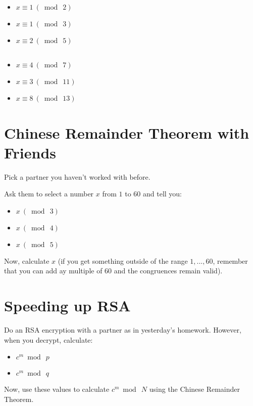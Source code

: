 \documentclass[12pt]{article}
\begin{document}
\begin{itemize}
\item $x \equiv 1 ~(\bmod~2)$
\item $x \equiv 1 ~(\bmod~3)$
\item $x \equiv 2 ~(\bmod~5)$
\end{itemize}


\subsection{}

\begin{itemize}
\item $x \equiv 4 ~(\bmod~7)$
\item $x \equiv 3 ~(\bmod~11)$
\item $x \equiv 8 ~(\bmod~13)$
\end{itemize}


\section{Chinese Remainder Theorem with Friends}

Pick a partner you haven't worked with before.

Ask them to select a number $x$ from $1$ to $60$ and tell you:

\begin{itemize}
\item $x ~(\bmod~3)$
\item $x ~(\bmod~4)$
\item $x ~(\bmod~5)$
\end{itemize}

Now, calculate $x$ (if you get something outside of the range $1, ..., 60$, remember that you can add ay multiple of 60 and the congruences remain valid).


\section{Speeding up RSA}

Do an RSA encryption with a partner as in yesterday's homework. However, when you decrypt, calculate:

\begin{itemize}
\item $c^m \bmod~p$
\item $c^m \bmod~q$
\end{itemize}

Now, use these values to calculate $c^m \bmod~N$ using the Chinese Remainder Theorem.
\end{document}
